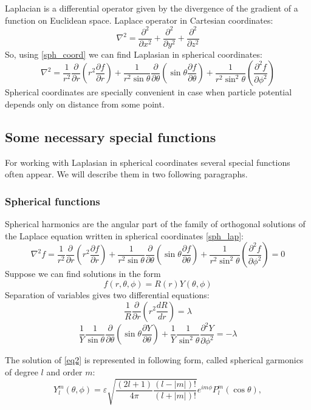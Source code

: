 \documentclass[a4paper, 12pt]{article}
\begin{document}
Laplacian is a differential operator given by the divergence of the gradient of a function on Euclidean space. Laplace operator in Cartesian coordinates:
 	$$\nabla^2= \frac{\partial^2}{\partial x^2}  + \frac{\partial^2}{\partial y^2} + \frac{\partial^2}{\partial z^2}$$
So, using \eqref{sph_coord} we can find Laplasian in spherical coordinates:
\begin{equation}\label{sph_lap}
	\nabla^2 = \frac{1}{r^2} \frac{\partial}{\partial r}({r^2}\frac{\partial f}{\partial r})+\frac{1}{r^2\sin{\theta}}\frac{\partial}{\partial \theta}(\sin{\theta}\frac{\partial f}{\partial \theta})+\frac{1}{r^2\sin^2{\theta}}(\frac{\partial^2 f}{\partial \phi^2})
\end{equation}
Spherical coordinates are specially convenient in case when particle potential depends only on distance from some point.


\subsection{Some  necessary special functions}
For working with Laplasian in spherical coordinates several special functions often appear. We will describe them in two following paragraphs.
\subsubsection{Spherical functions}
Spherical harmonics are the angular part of the family of orthogonal solutions of the Laplace equation written in spherical coordinates \eqref{sph_lap}:
$$\nabla^2 {f} = \frac{1}{r^2} \frac{\partial}{\partial r}({r^2}\frac{\partial f}{\partial r})+\frac{1}{r^2\sin{\theta}}\frac{\partial}{\partial \theta}(\sin{\theta}\frac{\partial f}{\partial \theta})+\frac{1}{r^2\sin^2{\theta}}(\frac{\partial^2 f}{\partial \phi^2}) = 0$$
Suppose we can find solutions in the form $$f({r}, \theta, \phi) = R(r)Y(\theta, \phi)$$
Separation of variables gives two differential equations:
$$\frac{1}{R}\frac{\partial}{\partial r}(r^2 \frac {dR}{dr}) = \lambda$$
\begin{equation}\label{eq2}
	\frac{1}{Y}\frac{1}{\sin{\theta}}\frac{\partial}{\partial \theta}(\sin{\theta}\frac{\partial Y}{\partial \theta})+\frac{1}{Y}\frac{1}{\sin^2{\theta}}\frac{\partial^2 Y}{\partial \phi^2} = -\lambda
\end{equation}


The solution of \eqref{eq2} is represented in following form, called spherical garmonics of degree $l$ and order $m$:
\begin{equation}\label{sph_garm}
	Y_l^m(\theta, \phi)=\varepsilon \sqrt{\frac{(2l+1)}{4\pi}\frac{(l-|m|)!}{(l+|m|)!}}e^{im\phi}P_l^m(\cos{\theta}),
\end{equation}
 
\end{document}
